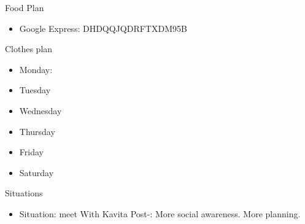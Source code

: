 \documentclass[serif, mathserif, final]{beamer}
\begin{document}
\begin{frame}
\begin{columns}
\begin{column}{0.25\linewidth}
  \begin{block}{Food Plan} 
    \begin{itemize}
      \tiny \item \tiny Google Express: DHDQQJQDRFTXDM95B
    \end{itemize}
  \end{block} 
  \begin{block}{Clothes plan} 
    \begin{itemize}
      \tiny \item \tiny Monday: 
    \item \tiny Tuesday
    \item \tiny Wednesday
    \item \tiny Thursday
    \item \tiny Friday
    \item \tiny Saturday
    \end{itemize} 
  \end{block} 

  \begin{block}{Situations}
    \begin{itemize}
      \tiny \item \tiny Situation: meet With Kavita  Post-: More social awareness. More planning.
    \end{itemize}
  \end{block}
\end{column} 
  \end{columns}
\end{frame}
\end{document}
